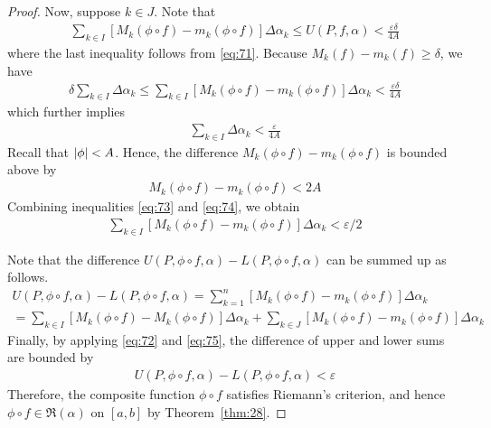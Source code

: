 \documentclass[thmcnt=section, 12pt]{my-elegantbook}
\begin{document}
\begin{proof}
    Now, suppose $k \in J$. Note that
    \begin{align*}
        \sum_{k \in I} \left[ M_k(\phi \circ f) - m_k(\phi \circ f) \right] \Delta \alpha_k
        \leq U(P,f,\alpha)
        < \frac{\varepsilon \delta}{4 A}
    \end{align*}
    where the last inequality follows from \eqref{eq:71}. Because $M_k(f) - m_k(f) \geq \delta$, we have
    \begin{align*}
        \delta \sum_{k \in I} \Delta \alpha_k
        \leq \sum_{k \in I} \left[ M_k(\phi \circ f) - m_k(\phi \circ f) \right] \Delta \alpha_k
        < \frac{\varepsilon \delta}{4 A}
    \end{align*}
    which further implies
    \begin{align}
        \sum_{k \in I} \Delta \alpha_k
        < \frac{\varepsilon}{4 A}
        \label{eq:73}
    \end{align}
    Recall that $\left\lvert \phi \right\rvert < A$. Hence, the difference $M_k(\phi \circ f) - m_k(\phi \circ f)$ is bounded above by
    \begin{align}
        M_k(\phi \circ f) - m_k(\phi \circ f)
        < 2A
        \label{eq:74}
    \end{align}
    Combining inequalities \eqref{eq:73} and \eqref{eq:74}, we obtain
    \begin{align}
        \sum_{k \in I} \left[ M_k(\phi \circ f) - m_k(\phi \circ f) \right] \Delta \alpha_k
        < \varepsilon / 2
        \label{eq:75}
    \end{align}

    Note that the difference $U(P,\phi \circ f, \alpha) - L(P,\phi \circ f, \alpha)$ can be summed up as follows.
    \begin{multline*}
        U(P,\phi \circ f, \alpha) - L(P,\phi \circ f, \alpha)
        = \sum_{k=1}^n \left[ M_k(\phi \circ f) - m_k(\phi \circ f) \right] \Delta \alpha_k \\
        = \sum_{k \in I} \left[ M_k(\phi \circ f) - M_k(\phi \circ f) \right] \Delta \alpha_k
        + \sum_{k \in J} \left[ M_k(\phi \circ f) - m_k(\phi \circ f) \right] \Delta \alpha_k
    \end{multline*}
    Finally, by applying \eqref{eq:72} and \eqref{eq:75}, the difference of upper and lower sums are bounded by
    \begin{align*}
        U(P,\phi \circ f, \alpha) - L(P,\phi \circ f, \alpha) < \varepsilon
    \end{align*}
    Therefore, the composite function $\phi \circ f$ satisfies Riemann's criterion, and hence $\phi \circ f \in \mathfrak{R}(\alpha)$ on $[a, b]$ by Theorem~\ref{thm:28}.
\end{proof}
\end{document}
